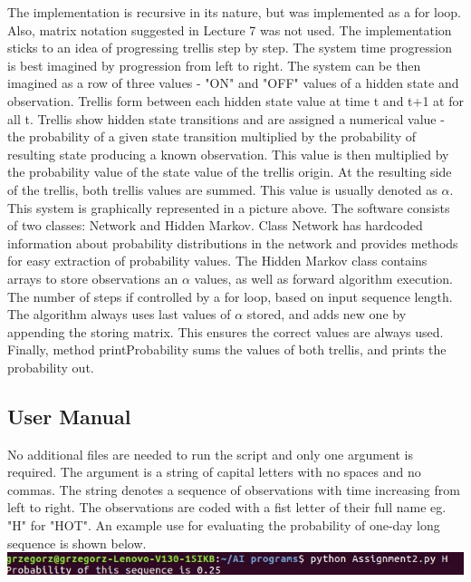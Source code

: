 \documentclass[10pt]{article}
\begin{document}
The implementation is recursive in its nature, but was implemented as a for loop. Also, matrix notation suggested in Lecture 7 was not used\citep{Lec7.2}. The implementation sticks to an idea of progressing trellis step by step. The system time progression is best imagined by progression from left to right. The system can be then imagined as a row of three values - "ON" and "OFF" values of a hidden state and observation. Trellis form between each hidden state value at time t and t+1 at for all t. Trellis show hidden state transitions and are assigned a numerical value - the probability of a given state transition multiplied by the probability of resulting state producing a known observation. This value is then multiplied by the probability value of the state value of the trellis origin. At the resulting side of the trellis, both trellis values are summed. This value is usually denoted as $\alpha$. This system is graphically represented in a picture above. 
The software consists of two classes: Network and Hidden Markov. Class Network has hardcoded information about probability distributions in the network and provides methods for easy extraction of probability values. The Hidden Markov class contains arrays to store observations an $\alpha$ values, as well as forward algorithm execution. The number of steps if controlled by a for loop, based on input sequence length. The algorithm always uses last values of $\alpha$ stored, and adds new one by appending the storing matrix. This ensures the correct values are always used. Finally, method printProbability sums the values of both trellis, and prints the probability out.





\subsection{User Manual}

No additional files are needed to run the script and only one argument is required. The argument is a string of capital letters with no spaces and no commas. The string denotes a sequence of observations with time increasing from left to right. The observations are coded with a fist letter of their full name eg. "H" for "HOT". An example use for evaluating the probability of one-day long sequence is shown below.\newline
\includegraphics[width=\textwidth]{UserManual3.jpg}
\end{document}
